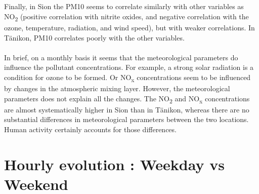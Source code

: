 \documentclass[a4paper, 12pt]{article}
\begin{document}
    \\
    \\
    Finally, in Sion the PM10 seems to correlate similarly with other variables as NO\textsubscript{2} (positive correlation with nitrite oxides, and negative correlation with the ozone, temperature, radiation, and wind speed), but with weaker correlations. In Tänikon, PM10 correlates poorly with the other variables. 
    \\
    \\
    In brief, on a monthly basis it seems that the meteorological parameters do influence the pollutant concentrations. For example, a strong solar radiation is a condition for ozone to be formed. Or NO\textsubscript{x} concentrations seem to be influenced by changes in the atmospheric mixing layer. However, the meteorological parameters does not explain all the changes. The NO\textsubscript{2} and NO\textsubscript{x} concentrations are almost systematically higher in Sion than in Tänikon, whereas there are no substantial differences in meteorological parameters between the two locations. Human activity certainly accounts for those differences.
    
\section{Hourly evolution : Weekday vs Weekend}
    
\end{document}
